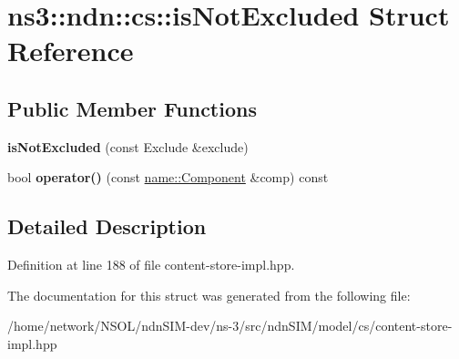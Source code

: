 \hypertarget{structns3_1_1ndn_1_1cs_1_1isNotExcluded}{}\section{ns3\+:\+:ndn\+:\+:cs\+:\+:is\+Not\+Excluded Struct Reference}
\label{structns3_1_1ndn_1_1cs_1_1isNotExcluded}
\subsection*{Public Member Functions}
\begin{DoxyCompactItemize}
\item 
{\bfseries is\+Not\+Excluded} (const Exclude \&exclude)\hypertarget{structns3_1_1ndn_1_1cs_1_1isNotExcluded_a4630e20ac824f09fac4138c380cf2cb5}{}\label{structns3_1_1ndn_1_1cs_1_1isNotExcluded_a4630e20ac824f09fac4138c380cf2cb5}

\item 
bool {\bfseries operator()} (const \hyperlink{classndn_1_1name_1_1Component}{name\+::\+Component} \&comp) const\hypertarget{structns3_1_1ndn_1_1cs_1_1isNotExcluded_a7cf30959052c2b54027bb491aea7f5c9}{}\label{structns3_1_1ndn_1_1cs_1_1isNotExcluded_a7cf30959052c2b54027bb491aea7f5c9}

\end{DoxyCompactItemize}


\subsection{Detailed Description}


Definition at line 188 of file content-\/store-\/impl.\+hpp.



The documentation for this struct was generated from the following file\+:\begin{DoxyCompactItemize}
\item 
/home/network/\+N\+S\+O\+L/ndn\+S\+I\+M-\/dev/ns-\/3/src/ndn\+S\+I\+M/model/cs/content-\/store-\/impl.\+hpp\end{DoxyCompactItemize}

